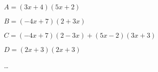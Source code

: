 \begin{exercice*}
    $A=(3x+4)(5x+2)$\par
    $B=(-4x+7)(2+3x)$\par
    $C=(-4x+7)(2-3x) +(5x-2)(3x+3)$\par
    $D=(2x+3)(2x+3)$
\end{exercice*}
\begin{corrige}
    \dots
\end{corrige}

